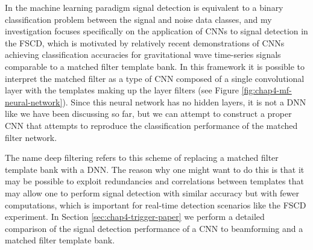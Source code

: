 In the machine learning paradigm signal detection is equivalent to a binary classification problem between the signal and noise data classes, and my investigation focuses specifically on the application of CNNs to signal detection in the FSCD, which is motivated by relatively recent demonstrations of CNNs achieving classification accuracies for gravitational wave time-series signals comparable to a matched filter template bank. In this framework it is possible to interpret the matched filter as a type of CNN composed of a single convolutional layer with the templates making up the layer filters (see Figure \ref{fig:chap4-mf-neural-network}). Since this neural network has no hidden layers, it is not a DNN like we have been discussing so far, but we can attempt to construct a proper CNN that attempts to reproduce the classification performance of the matched filter network.

The name deep filtering refers to this scheme of replacing a matched filter template bank with a DNN. The reason why one might want to do this is that it may be possible to exploit redundancies and correlations between templates that may allow one to perform signal detection with similar accuracy but with fewer computations, which is important for real-time detection scenarios like the FSCD experiment. In Section \ref{sec:chap4-trigger-paper} we perform a detailed comparison of the signal detection performance of a CNN to beamforming and a matched filter template bank.

